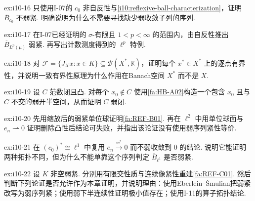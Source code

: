 \begin{FAExercise}{ex:i10-16}
只使用I-07的 \(\displaystyle c_0\) 非自反性与\autoref{i10:reflexive-ball-characterization}，证明 \(\displaystyle \overline B_{c_0}\) 不弱紧. 明确说明为什么不需要寻找缺少弱收敛子列的序列.
\end{FAExercise}

\begin{FAExercise}{ex:i10-17}
在I-07已经证明的 \(\displaystyle \sigma\)-有限且 \(\displaystyle 1<p<\infty\) 的范围内，由自反性推出 \(\displaystyle \overline B_{L^p(\mu)}\) 弱紧. 再写出计数测度得到的 \(\displaystyle \ell^p\) 特例.
\end{FAExercise}

\begin{FAExercise}[弱紧集的范数有界性]{ex:i10-18}
对 \(\displaystyle \mathcal F=\{J_Xx:x\in K\}\subseteq\mathcal B(X^*,\mathbb K)\)，证明每个 \(\displaystyle x^*\in X^*\) 上的逐点有界性，并说明一致有界性原理为什么作用在Banach空间 \(\displaystyle X^*\) 而不是 \(\displaystyle X\).
\end{FAExercise}

\begin{FAExercise}[闭凸集的弱闭性]{ex:i10-19}
设 \(\displaystyle C\) 范数闭且凸. 对每个 \(\displaystyle x_0\notin C\) 使用\autoref{fa:HB-A02}构造一个包含 \(\displaystyle x_0\) 且与 \(\displaystyle C\) 不交的弱开半空间，从而证明 \(\displaystyle C\) 弱闭.
\end{FAExercise}

\begin{FAExercise}[闭有界凸集的弱紧性与凸性边界]{ex:i10-20}
先用缩放后的弱紧单位球证明\autoref{fa:REF-B01}. 再在 \(\displaystyle \ell^2\) 中用单位球面与 \(\displaystyle e_n\rightharpoonup0\) 证明删除凸性后结论可失败，并指出该论证没有使用弱序列紧性等价.
\end{FAExercise}

\begin{FAExercise}[弱*与弱的拓扑区分]{ex:i10-21}
在 \(\displaystyle (c_0)^*\cong\ell^1\) 中复用 \(\displaystyle e_n\overset{w^*}{\longrightarrow}0\) 而不弱收敛到 \(\displaystyle0\) 的结论. 说明它能证明两种拓扑不同，但为什么不能单靠这个序列判定 \(\displaystyle \overline B_{\ell^1}\) 是否弱紧.
\end{FAExercise}

\begin{FAExercise}[存在性模板与禁止前向调用]{ex:i10-22}
设 \(\displaystyle K\) 非空弱紧. 分别用有限交性质与连续像紧性重建\autoref{fa:REF-C01}. 然后判断下列论证是否允许作为本章证明，并说明理由：使用Eberlein--\v Smulian把弱紧改写为弱序列紧；使用弱下半连续性证明极小值存在；使用I-11的算子拓扑结论.
\end{FAExercise}
